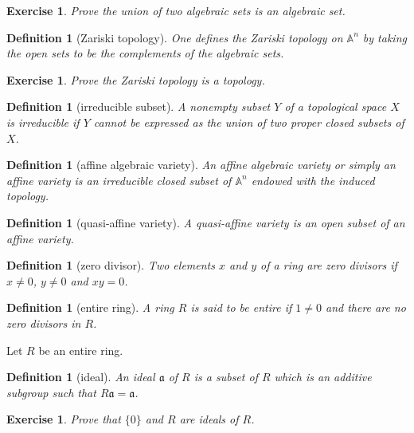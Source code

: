 \documentclass[12pt]{report}
\newtheorem{definition}[proposition]{Definition}
\newtheorem{ex}[proposition]{Exercise}
\begin{document}
\begin{ex}
	Prove the union of two algebraic sets is an algebraic set.
\end{ex}		

\begin{definition}[Zariski topology]
	One defines the Zariski topology on $\mathbb{A}^n$ by taking the open sets to be the complements of the algebraic sets.
\end{definition}

\begin{ex}
	Prove the Zariski topology is a topology. 
\end{ex}

\begin{definition}[irreducible subset]
	A nonempty subset $Y$ of a topological space $X$ is irreducible if $Y$ cannot be expressed as the union of two proper closed subsets of $X$. 
\end{definition}

\begin{definition}[affine algebraic variety]
	An affine algebraic variety or simply an affine variety is an irreducible closed subset of $\mathbb{A}^n$ endowed with the induced topology. 
\end{definition}

\begin{definition}[quasi-affine variety]
	A quasi-affine variety is an open subset of an affine variety. 
\end{definition}

\begin{definition}[zero divisor]
	Two elements $x$ and $y$ of a ring are zero divisors if $x \neq 0$, $y \neq 0$ and $x y = 0$.
\end{definition}

\begin{definition}[entire ring]
	A ring $R$ is said to be entire if $1 \neq 0$ and there are no zero divisors in $R$. 
\end{definition}

Let $R$ be an entire ring. 

\begin{definition}[ideal]
	An ideal $\mathfrak{a}$ of $R$ is a subset of $R$ which is an additive subgroup such that $R\mathfrak{a} = \mathfrak{a}$.
\end{definition}

\begin{ex}
	Prove that $\lbrace 0 \rbrace$ and $R$ are ideals of $R$.
\end{ex}
\end{document}
